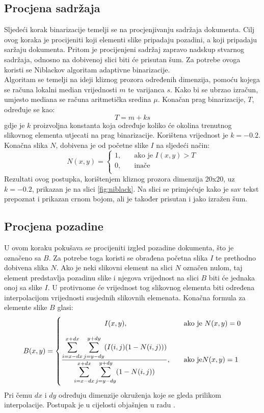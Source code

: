\documentclass[times, utf8, zavrsni, numeric]{fer}
\begin{document}
\subsection{Procjena sadržaja}
Sljedeći korak binarizacije temelji se na procjenjivanju sadržaja dokumenta. 
Cilj ovog koraka je procijeniti koji elementi slike pripadaju pozadini, a koji pripadaju saržaju dokumenta. 
Pritom je procijenjeni sadržaj zapravo nadskup stvarnog sadržaja, odnosno na dobivenoj slici biti će prisutan šum. 
Za potrebe ovoga koristi se Niblackov algoritam adaptivne binarizacije. \cite{AdaptiveBinarization}\\

Algoritam se temelji na ideji kliznog prozora određenih dimenzija, pomoću kojega se računa lokalni median vrijednosti $m$ te varijanca $s$. 
Kako bi se ubrzao izračun, umjesto mediana se računa aritmetička sredina $\mu$.
Konačan prag binarizacije, $T$, određuje se kao:
\[ T = m + ks \]
gdje je $k$ proizvoljna konstanta koja određuje koliko će okolina trenutnog slikovnog elementa utjecati na prag binarizacije.
Korištena vrijednost je $k = -0.2$.
Konačna slika $N$, dobivena je od početne slike $I$ na sljedeći način:
\[
    N(x, y) =
    \begin{cases}
        1,   & \quad \text{ako je } I(x, y) > T\\
        0,  & \quad \text{inače}\\
    \end{cases}
\]
Rezultati ovog postupka, korištenjem kliznog prozora dimenzija $20$x$20$, uz $k=-0.2$, prikazan je na slici \ref{fig:niblack}.
Na slici se primjećuje kako je sav tekst prepoznat i prikazan crnom bojom, ali je također prisutan i jako izražen šum.

\subsection{Procjena pozadine}
U ovom koraku pokušava se procijeniti izgled pozadine dokumenta, što je označeno sa $B$. 
Za potrebe toga koristi se obrađena početna slika $I$ te prethodno dobivena slika $N$.
Ako je neki slikovni element na slici $N$ označen nulom, taj element predstavlja pozadinu slike i njegova vrijednost na slici $B$ biti će jednaka onoj sa slike $I$.
U protivnome će vrijednost tog slikovnog elementa biti određena interpolacijom vrijednosti susjednih slikovnih elemenata.
Konačna formula za elemente slike $B$ glasi:
\[
    B(x, y) =
    \begin{cases}
        \hfil
        I(x, y),    & \quad \text{ako je } N(x, y) = 0\\[1em]
        \frac{
            \displaystyle \sum_{i = x-dx}^{x+dx}
            \displaystyle \sum_{j = y-dy}^{y+dy}
            (I(i, j)(1 - N(i, j)))
        } {
            \displaystyle \sum_{i = x-dx}^{x+dx}
            \displaystyle \sum_{j = y-dy}^{y+dy}
            (1 - N(i, j))
        }, & \quad \text{ako je} N(x, y) = 1\\

    \end{cases}
\]
Pri čemu $dx$ i $dy$ određuju dimenzije okruženja koje se gleda prilikom interpolacije.
Postupak je u cijelosti objašnjen u radu \cite{AdaptiveBinarization}.\\
\end{document}

